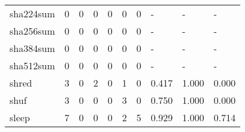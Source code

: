 \begin{longtable}{lp{2.0cm}p{2.0cm}p{2.0cm}p{2.0cm}p{2.0cm}p{2.0cm}p{2.0cm}p{2.0cm}p{2.0cm}}
sha224sum &                      0 &                                             0 &                                            0 &                                           0 &                                            0 &                                          0 &                                    - &                                      - &                                    - \\
sha256sum &                      0 &                                             0 &                                            0 &                                           0 &                                            0 &                                          0 &                                    - &                                      - &                                    - \\
sha384sum &                      0 &                                             0 &                                            0 &                                           0 &                                            0 &                                          0 &                                    - &                                      - &                                    - \\
sha512sum &                      0 &                                             0 &                                            0 &                                           0 &                                            0 &                                          0 &                                    - &                                      - &                                    - \\
shred     &                      3 &                                             0 &                                            2 &                                           0 &                                            1 &                                          0 &                                0.417 &                                  1.000 &                                0.000 \\
shuf      &                      3 &                                             0 &                                            0 &                                           0 &                                            3 &                                          0 &                                0.750 &                                  1.000 &                                0.000 \\
sleep     &                      7 &                                             0 &                                            0 &                                           0 &                                            2 &                                          5 &                                0.929 &                                  1.000 &                                0.714 \\

\end{longtable}
